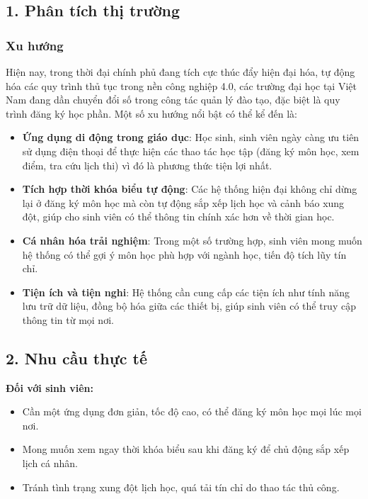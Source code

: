 \documentclass[../main.tex]{subfiles}
\begin{document}
\subsection*{1. Phân tích thị trường}

\subsubsection*{Xu hướng}
Hiện nay, trong thời đại chính phủ đang tích cực thúc đẩy hiện đại hóa, tự động hóa các quy trình thủ tục trong nền công nghiệp 4.0, các trường đại học tại Việt Nam đang dần chuyển đổi số trong công tác quản lý đào tạo, đặc biệt là quy trình đăng ký học phần. Một số xu hướng nổi bật có thể kể đến là:

\begin{itemize}
        \item \textbf{Ứng dụng di động trong giáo dục}: Học sinh, sinh viên ngày càng ưu tiên sử dụng điện thoại để thực hiện các thao tác học tập (đăng ký môn học, xem điểm, tra cứu lịch thi) vì đó là phương thức tiện lợi nhất.
        \item \textbf{Tích hợp thời khóa biểu tự động}: Các hệ thống hiện đại không chỉ dừng lại ở đăng ký môn học mà còn tự động sắp xếp lịch học và cảnh báo xung đột, giúp cho sinh viên có thể thông tin chính xác hơn về thời gian học.
        \item \textbf{Cá nhân hóa trải nghiệm}: Trong một số trường hợp, sinh viên mong muốn hệ thống có thể gợi ý môn học phù hợp với ngành học, tiến độ tích lũy tín chỉ.
        \item \textbf{Tiện ích và tiện nghi}: Hệ thống cần cung cấp các tiện ích như tính năng lưu trữ dữ liệu, đồng bộ hóa giữa các thiết bị, giúp sinh viên có thể truy cập thông tin từ mọi nơi.
\end{itemize}

\subsection*{2. Nhu cầu thực tế}

\textbf{Đối với sinh viên:}
\begin{itemize}
    \item Cần một ứng dụng đơn giản, tốc độ cao, có thể đăng ký môn học mọi lúc mọi nơi.
    \item Mong muốn xem ngay thời khóa biểu sau khi đăng ký để chủ động sắp xếp lịch cá nhân.
    \item Tránh tình trạng xung đột lịch học, quá tải tín chỉ do thao tác thủ công.
\end{itemize}
\end{document}
